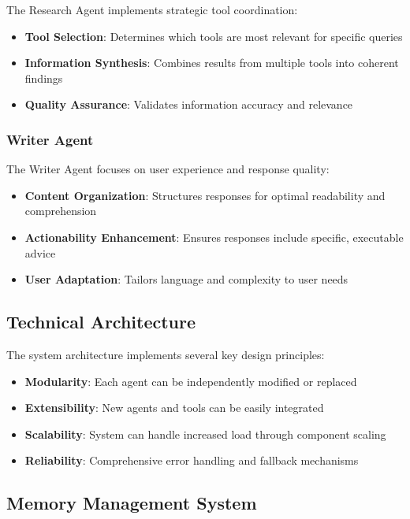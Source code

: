 \documentclass[conference]{IEEEtran}
\begin{document}
The Research Agent implements strategic tool coordination:

\begin{itemize}
\item \textbf{Tool Selection}: Determines which tools are most relevant for specific queries
\item \textbf{Information Synthesis}: Combines results from multiple tools into coherent findings
\item \textbf{Quality Assurance}: Validates information accuracy and relevance
\end{itemize}

\subsubsection{Writer Agent}

The Writer Agent focuses on user experience and response quality:

\begin{itemize}
\item \textbf{Content Organization}: Structures responses for optimal readability and comprehension
\item \textbf{Actionability Enhancement}: Ensures responses include specific, executable advice
\item \textbf{User Adaptation}: Tailors language and complexity to user needs
\end{itemize}

\subsection{Technical Architecture}

The system architecture implements several key design principles:

\begin{itemize}
\item \textbf{Modularity}: Each agent can be independently modified or replaced
\item \textbf{Extensibility}: New agents and tools can be easily integrated
\item \textbf{Scalability}: System can handle increased load through component scaling
\item \textbf{Reliability}: Comprehensive error handling and fallback mechanisms
\end{itemize}

\subsection{Memory Management System}
\end{document}
